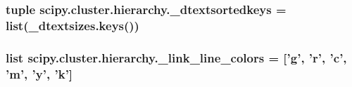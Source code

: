 \subsubsection[{\+\_\+dtextsortedkeys}]{\setlength{\rightskip}{0pt plus 5cm}tuple scipy.\+cluster.\+hierarchy.\+\_\+dtextsortedkeys = list(\+\_\+dtextsizes.\+keys())}\label{namespacescipy_1_1cluster_1_1hierarchy_a7261f809976b2b79252f0c9119182b4f}
\hypertarget{namespacescipy_1_1cluster_1_1hierarchy_a446dcf1e49353bbdaaf45d973eef5883}{}
\subsubsection[{\+\_\+link\+\_\+line\+\_\+colors}]{\setlength{\rightskip}{0pt plus 5cm}list scipy.\+cluster.\+hierarchy.\+\_\+link\+\_\+line\+\_\+colors = \mbox{[}'g', '{\bf r}', 'c', '{\bf m}', 'y', '{\bf k}'\mbox{]}}\label{namespacescipy_1_1cluster_1_1hierarchy_a446dcf1e49353bbdaaf45d973eef5883}
